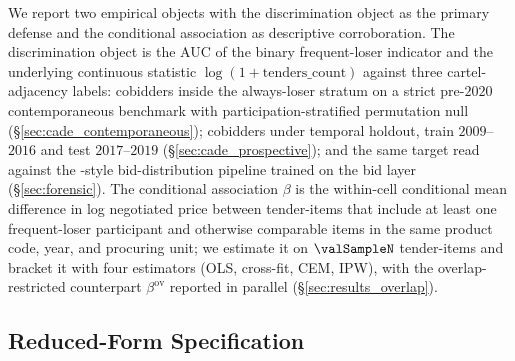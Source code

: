 We report two empirical objects with the discrimination object
as the primary defense and the conditional association as
descriptive corroboration. The discrimination object is the AUC
of the binary frequent-loser indicator and the underlying
continuous statistic $\log(1+\text{tenders\_count})$ against three
cartel-adjacency labels: cobidders inside the always-loser
stratum on a strict pre-$2020$ contemporaneous benchmark with
participation-stratified permutation null
(\S\ref{sec:cade_contemporaneous}); cobidders under temporal
holdout, train $2009$--$2016$ and test $2017$--$2019$
(\S\ref{sec:cade_prospective}); and the same target read against
the \citet{imhof2019detecting}-style bid-distribution pipeline
trained on the bid layer (\S\ref{sec:forensic}). The conditional
association $\beta$ is the within-cell conditional mean
difference in log negotiated price between tender-items that
include at least one frequent-loser participant and otherwise
comparable items in the same product code, year, and procuring
unit; we estimate it on $\valSampleN$ tender-items and bracket
it with four estimators (OLS, cross-fit, CEM, IPW), with the
overlap-restricted counterpart $\beta^{\text{ov}}$ reported in
parallel (\S\ref{sec:results_overlap}).

\subsection{Reduced-Form Specification}
\label{sec:emp_reduced}

